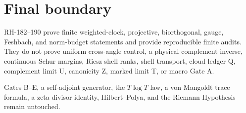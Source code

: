\documentclass[12pt]{article}
\theoremstyle{remark}
\begin{document}
\section{Final boundary}

RH-182--190 prove finite weighted-clock, projective, biorthogonal, gauge,
Feshbach, and norm-budget statements and provide reproducible finite audits.
They do not prove uniform cross-angle control, a physical complement inverse,
continuous Schur margins, Riesz shell ranks, shell transport, cloud ledger Q,
complement limit U, canonicity Z, marked limit T, or macro Gate A.

Gates B--E, a self-adjoint generator, the $T\log T$ law, a von Mangoldt
trace formula, a zeta divisor identity, Hilbert--Polya, and the Riemann
Hypothesis remain untouched.



\end{document}
